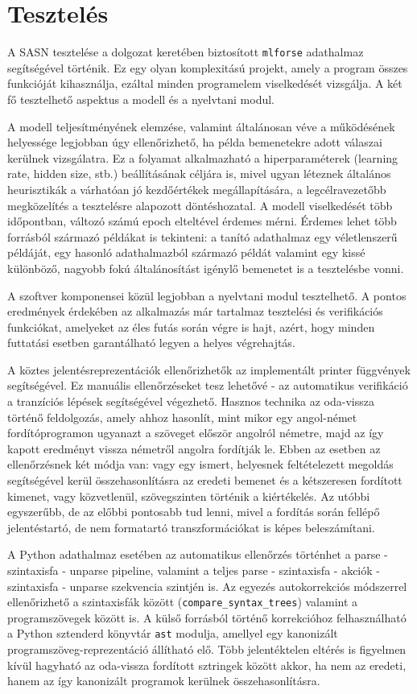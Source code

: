 \documentclass[twoside, 12pt]{report}
\begin{document}
\section{Tesztelés}

A SASN tesztelése a dolgozat keretében biztosított \verb|mlforse| adathalmaz segítségével történik. Ez egy olyan komplexitású projekt, amely a program összes funkcióját kihasználja, ezáltal minden programelem viselkedését vizsgálja. A két fő tesztelhető aspektus a modell és a nyelvtani modul.

A modell teljesítményének elemzése, valamint általánosan véve a működésének helyessége legjobban úgy ellenőrizhető, ha példa bemenetekre adott válaszai kerülnek vizsgálatra. Ez a folyamat alkalmazható a hiperparaméterek (learning rate, hidden size, stb.) beállításának céljára is, mivel ugyan léteznek általános heurisztikák a várhatóan jó kezdőértékek megállapítására, a legcélravezetőbb megközelítés a tesztelésre alapozott döntéshozatal. A modell viselkedését több időpontban, változó számú epoch elteltével érdemes mérni. Érdemes lehet több forrásból származó példákat is tekinteni: a tanító adathalmaz egy véletlenszerű példáját, egy hasonló adathalmazból származó példát valamint egy kissé különböző, nagyobb fokú általánosítást igénylő bemenetet is a tesztelésbe vonni.

A szoftver komponensei közül legjobban a nyelvtani modul tesztelhető. A pontos eredmények érdekében az alkalmazás már tartalmaz tesztelési és verifikációs funkciókat, amelyeket az éles futás során végre is hajt, azért, hogy minden futtatási esetben garantálható legyen a helyes végrehajtás.

A köztes jelentésreprezentációk ellenőrizhetők az implementált printer függvények segítségével. Ez manuális ellenőrzéseket tesz lehetővé - az automatikus verifikáció a tranzíciós lépések segítségével végezhető. Hasznos technika az oda-vissza történő feldolgozás, amely ahhoz hasonlít, mint mikor egy angol-német fordítóprogramon ugyanazt a szöveget először angolról németre, majd az így kapott eredményt vissza németről angolra fordítják le. Ebben az esetben az ellenőrzésnek két módja van: vagy egy ismert, helyesnek feltételezett megoldás segítségével kerül összehasonlításra az eredeti bemenet és a kétszeresen fordított kimenet, vagy közvetlenül, szövegszinten történik a kiértékelés. Az utóbbi egyszerűbb, de az előbbi pontosabb tud lenni, mivel a fordítás során fellépő jelentéstartó, de nem formatartó transzformációkat is képes beleszámítani.

A Python adathalmaz esetében az automatikus ellenőrzés történhet a parse - szintaxisfa - unparse pipeline, valamint a teljes parse - szintaxisfa - akciók - szintaxisfa - unparse szekvencia szintjén is. Az egyezés autokorrekciós módszerrel ellenőrizhető a szintaxisfák között (\verb|compare_syntax_trees|) valamint a programszövegek között is. A külső forrásból történő korrekcióhoz felhasználható a Python sztenderd könyvtár \verb|ast| modulja, amellyel egy kanonizált programszöveg-reprezentáció állítható elő. Több jelentéktelen eltérés is figyelmen kívül hagyható az oda-vissza fordított sztringek között akkor, ha nem az eredeti, hanem az így kanonizált programok kerülnek összehasonlításra.
\end{document}
